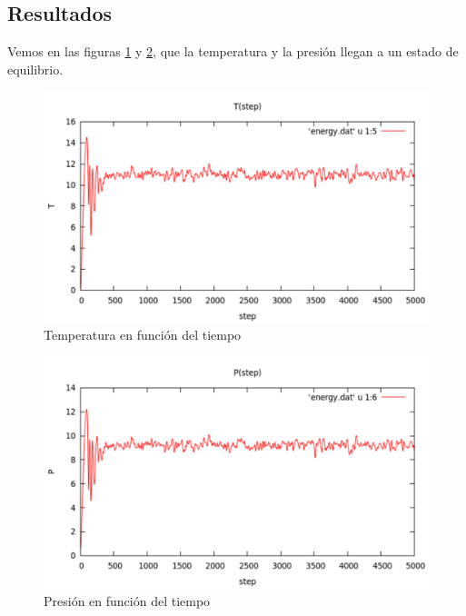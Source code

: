 \subsection{Resultados}
Vemos en las figuras \ref{fig:tempe} y \ref{fig:presion}, que la temperatura y la presión llegan a un estado de equilibrio.
\begin{figure}[h!]
\includegraphics[scale=0.50]{temperatura.pdf} 
\caption{Temperatura en función del tiempo} 
\label{fig:tempe}
\end{figure}\begin{figure}[h!]
\includegraphics[scale=0.50]{presion.pdf} 
\caption{Presión en función del tiempo} 
\label{fig:presion}
\end{figure}